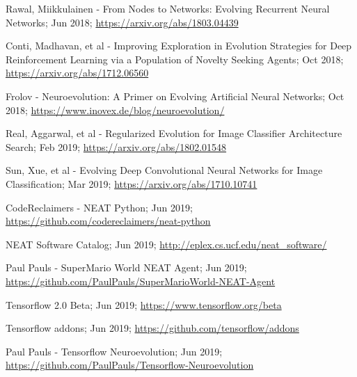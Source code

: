 \documentclass[journal, a4paper]{IEEEtran}
\begin{document}
\begin{thebibliography}{5}
    Rawal, Miikkulainen - From Nodes to Networks: Evolving Recurrent Neural Networks; Jun 2018;
    \url{https://arxiv.org/abs/1803.04439}

    Conti, Madhavan, et al - Improving Exploration in Evolution Strategies for Deep Reinforcement Learning via a Population of Novelty Seeking Agents; Oct 2018;
    \url{https://arxiv.org/abs/1712.06560}

    Frolov - Neuroevolution: A Primer on Evolving Artificial Neural Networks; Oct 2018;
    \url{https://www.inovex.de/blog/neuroevolution/}

    Real, Aggarwal, et al - Regularized Evolution for Image Classifier Architecture Search; Feb 2019;
    \url{https://arxiv.org/abs/1802.01548}

    Sun, Xue, et al - Evolving Deep Convolutional Neural Networks for Image Classification; Mar 2019;
    \url{https://arxiv.org/abs/1710.10741}

    CodeReclaimers - NEAT Python; Jun 2019;
    \url{https://github.com/codereclaimers/neat-python}

    NEAT Software Catalog; Jun 2019;
    \url{http://eplex.cs.ucf.edu/neat_software/}

    Paul Pauls - SuperMario World NEAT Agent; Jun 2019;
    \url{https://github.com/PaulPauls/SuperMarioWorld-NEAT-Agent}

    Tensorflow 2.0 Beta; Jun 2019;
    \url{https://www.tensorflow.org/beta}

    Tensorflow addons; Jun 2019;
    \url{https://github.com/tensorflow/addons}

    Paul Pauls - Tensorflow Neuroevolution; Jun 2019;
    \url{https://github.com/PaulPauls/Tensorflow-Neuroevolution}

\end{thebibliography}
\end{document}
